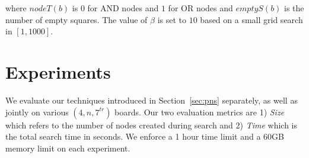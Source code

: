 \documentclass[conference]{IEEEtran}
\theoremstyle{definition}
\begin{document}
\noindent where $nodeT(b)$ is $0$ for AND nodes and $1$ for OR nodes and $emptyS(b)$ is the number of empty squares. The value of $\beta$ is set to $10$ based on a small grid search in $[1, 1000]$.


\section{Experiments}
\label{sec:experiments}

We evaluate our techniques introduced in Section~\ref{sec:pns} separately, as well as jointly on various $(4,n,7^{tr})$ boards. Our two evaluation metrics are 1) \emph{Size} which refers to the number of nodes created during search and 2) \emph{Time} which is the total search time in seconds. We enforce a 1 hour time limit and a 60GB memory limit on each experiment. 
\end{document}
